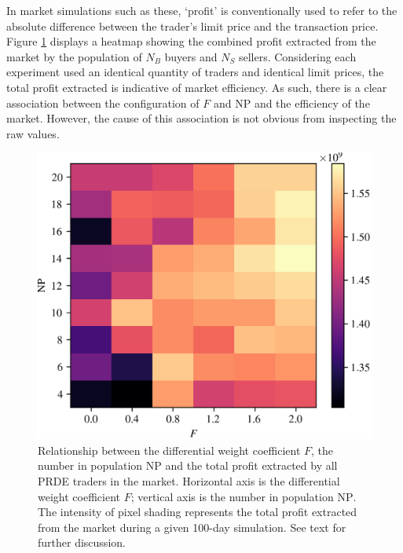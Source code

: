 \documentclass[conference]{IEEEtran}
\begin{document}
In market simulations such as these, `profit' is conventionally used to refer to the absolute difference between the trader's limit price and the transaction price.
Figure \ref{profit_grid} displays a heatmap showing the combined profit extracted from the market by the population of $N_B$ buyers and $N_S$ sellers.
Considering each experiment used an identical quantity of traders and identical limit prices, the total profit extracted is indicative of market efficiency.
As such, there is a clear association between the configuration of $F$ and $\mathrm{NP}$ and the efficiency of the market.
However, the cause of this association is not obvious from inspecting the raw values.

\begin{figure}[htbp]
    \centerline{\includegraphics[width=\columnwidth]{profit_grid.png}}
    \caption{
        Relationship between the differential weight coefficient $F$, the number in population $\mathrm{NP}$ and the total profit extracted by all PRDE traders in the market.
        Horizontal axis is the differential weight coefficient $F$; vertical axis is the number in population $\mathrm{NP}$.
        The intensity of pixel shading represents the total profit extracted from the market during a given 100-day simulation.
        See text for further discussion.
    }
    \label{profit_grid}
\end{figure}
\end{document}
